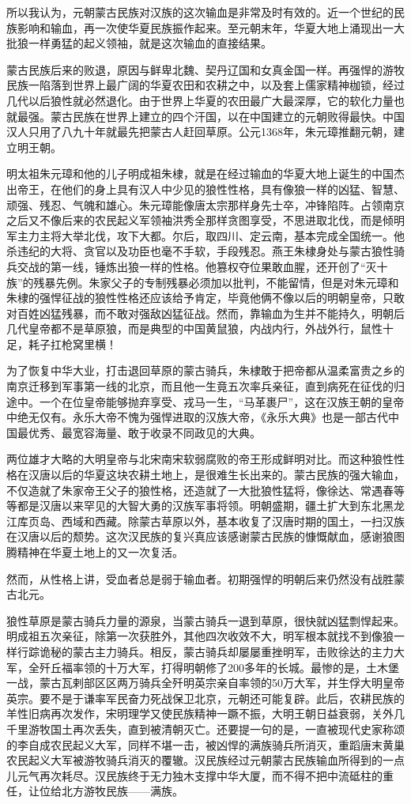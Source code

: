 \par 所以我认为，元朝蒙古民族对汉族的这次输血是非常及时有效的。近一个世纪的民族影响和输血，再一次使华夏民族振作起来。至元朝末年，华夏大地上涌现出一大批狼一样勇猛的起义领袖，就是这次输血的直接结果。
\par 蒙古民族后来的败退，原因与鲜卑北魏、契丹辽国和女真金国一样。再强悍的游牧民族一陷落到世界上最广阔的华夏农田和农耕之中，以及套上儒家精神枷锁，经过几代以后狼性就必然退化。由于世界上华夏的农田最广大最深厚，它的软化力量也就最强。蒙古民族在世界上建立的四个汗国，以在中国建立的元朝败得最快。中国汉人只用了八九十年就最先把蒙古人赶回草原。公元1368年，朱元璋推翻元朝，建立明王朝。
\par 明太祖朱元璋和他的儿子明成祖朱棣，就是在经过输血的华夏大地上诞生的中国杰出帝王，在他们的身上具有汉人中少见的狼性性格，具有像狼一样的凶猛、智慧、顽强、残忍、气魄和雄心。朱元璋能像唐太宗那样身先士卒，冲锋陷阵。占领南京之后又不像后来的农民起义军领袖洪秀全那样贪图享受，不思进取北伐，而是倾明军主力主将大举北伐，攻下大都。尔后，取四川、定云南，基本完成全国统一。他杀违纪的大将、贪官以及功臣也毫不手软，手段残忍。燕王朱棣身处与蒙古狼性骑兵交战的第一线，锤炼出狼一样的性格。他篡权夺位果敢血腥，还开创了“灭十族”的残暴先例。朱家父子的专制残暴必须加以批判，不能留情，但是对朱元璋和朱棣的强悍征战的狼性性格还应该给予肯定，毕竟他俩不像以后的明朝皇帝，只敢对百姓凶猛残暴，而不敢对强敌凶猛征战。然而，靠输血为生并不能持久，明朝后几代皇帝都不是草原狼，而是典型的中国黄鼠狼，内战内行，外战外行，鼠性十足，耗子扛枪窝里横！
\par 为了恢复中华大业，打击退回草原的蒙古骑兵，朱棣敢于把帝都从温柔富贵之乡的南京迁移到军事第一线的北京，而且他一生竟五次率兵亲征，直到病死在征伐的归途中。一个在位皇帝能够抛弃享受、戎马一生，“马革裹尸”，这在汉族王朝的皇帝中绝无仅有。永乐大帝不愧为强悍进取的汉族大帝，《永乐大典》也是一部古代中国最优秀、最宽容海量、敢于收录不同政见的大典。
\par 两位雄才大略的大明皇帝与北宋南宋软弱腐败的帝王形成鲜明对比。而这种狼性性格在汉唐以后的华夏这块农耕土地上，是很难生长出来的。蒙古民族的强大输血，不仅造就了朱家帝王父子的狼性格，还造就了一大批狼性猛将，像徐达、常遇春等等都是汉唐以来罕见的大智大勇的汉族军事将领。明朝盛期，疆土扩大到东北黑龙江库页岛、西域和西藏。除蒙古草原以外，基本收复了汉唐时期的国土，一扫汉族在汉唐以后的颓势。这次汉民族的复兴真应该感谢蒙古民族的慷慨献血，感谢狼图腾精神在华夏土地上的又一次复活。
\par 然而，从性格上讲，受血者总是弱于输血者。初期强悍的明朝后来仍然没有战胜蒙古北元。
\par 狼性草原是蒙古骑兵力量的源泉，当蒙古骑兵一退到草原，很快就凶猛剽悍起来。明成祖五次亲征，除第一次获胜外，其他四次收效不大，明军根本就找不到像狼一样行踪诡秘的蒙古主力骑兵。相反，蒙古骑兵却屡屡重挫明军，击败徐达的主力大军，全歼丘福率领的十万大军，打得明朝修了200多年的长城。最惨的是，土木堡一战，蒙古瓦剌部区区两万骑兵全歼明英宗亲自率领的50万大军，并生俘大明皇帝英宗。要不是于谦率军民奋力死战保卫北京，元朝还可能复辟。此后，农耕民族的羊性旧病再次发作，宋明理学又使民族精神一蹶不振，大明王朝日益衰弱，关外几千里游牧国土再次丢失，直到被清朝灭亡。还要提一句的是，一直被现代史家称颂的李自成农民起义大军，同样不堪一击，被凶悍的满族骑兵所消灭，重蹈唐末黄巢农民起义大军被游牧骑兵消灭的覆辙。汉民族经过元朝蒙古民族输血所得到的一点儿元气再次耗尽。汉民族终于无力独木支撑中华大厦，而不得不把中流砥柱的重任，让位给北方游牧民族——满族。
